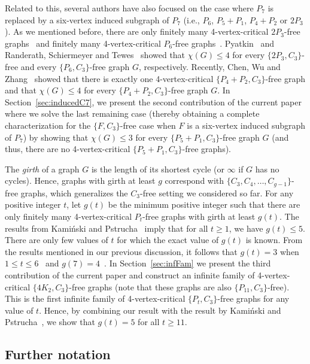 \documentclass[11pt,a4paper]{article}
\theoremstyle{definition}
\begin{document}
Related to this, several authors have also focused on the case where $P_7$ is replaced by a six-vertex induced subgraph of $P_7$ (i.e., $P_6$, $P_5+P_1$, $P_4+P_2$ or $2P_3$). As we mentioned before, there are only finitely many 4-vertex-critical $2P_3$-free graphs~\cite{CGSZ20a} and finitely many 4-vertex-critical $P_6$-free graphs~\cite{CGSZ20b}. Pyatkin~\cite{P13} and Randerath, Schiermeyer and Tewes~\cite{RST02} showed that $\chi(G) \leq 4$ for every $\{2P_3,C_3\}$-free and every $\{P_6,C_3\}$-free graph $G$, respectively. Recently, Chen, Wu and Zhang~\cite{CWZ25} showed that there is exactly one 4-vertex-critical $\{P_4+P_2,C_3\}$-free graph and that $\chi(G) \leq 4$ for every $\{P_4+P_2,C_3\}$-free graph $G$. In Section~\ref{sec:inducedC7}, we present the second contribution of the current paper where we solve the last remaining case (thereby obtaining a complete characterization for the $\{F,C_3\}$-free case when $F$ is a six-vertex induced subgraph of $P_7$) by showing that $\chi(G) \leq 3$ for every $\{P_5+P_1,C_3\}$-free graph $G$ (and thus, there are no 4-vertex-critical $\{P_5+P_1,C_3\}$-free graphs).

The \textit{girth} of a graph $G$ is the length of its shortest cycle (or $\infty$ if $G$ has no cycles). Hence, graphs with girth at least $g$ correspond with $\{C_3,C_4,\ldots,C_{g-1}\}$-free graphs, which generalizes the $C_3$-free setting we considered so far. For any positive integer $t$, let $g(t)$ be the minimum positive integer such that there are only finitely many 4-vertex-critical $P_t$-free graphs with girth at least $g(t)$. The results from Kami\'{n}ski and Pstrucha~\cite{KP19} imply that for all $t \geq 1$, we have $g(t) \leq 5$. There are only few values of $t$ for which the exact value of $g(t)$ is known. From the results mentioned in our previous discussion, it follows that $g(t)=3$ when $1 \leq t \leq 6$~\cite{CGSZ20b} and $g(7)=4$~\cite{CGSZ20b,BEtAl21}. In Section~\ref{sec:infFam} we present the third contribution of the current paper and construct an infinite family of 4-vertex-critical $\{4K_2, C_3\}$-free graphs (note that these graphs are also $\{P_{11}, C_3\}$-free). This is the first infinite family of 4-vertex-critical $\{P_t, C_3\}$-free graphs for any value of $t$. Hence, by combining our result with the result by Kami\'{n}ski and Pstrucha~\cite{KP19}, we show that $g(t)=5$ for all $t \geq 11$.
\subsection{Further notation}
\end{document}
